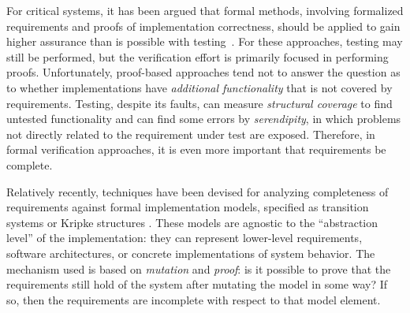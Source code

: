 

For critical systems, it has been argued that formal methods, involving formalized requirements and proofs of implementation correctness, should be applied to gain higher assurance than is possible with testing~\cite{ModelCheckingTakesOff,Miller,Rushby}.  For these approaches, testing may still be performed, but the verification effort is primarily focused in performing proofs.  Unfortunately, proof-based approaches tend not to answer the question as to whether implementations have {\em additional functionality} that is not covered by requirements.  Testing, despite its faults, can measure {\em structural coverage} to find untested functionality and can find some errors by {\em serendipity}, in which problems not directly related to the requirement under test are exposed.  Therefore, in formal verification approaches, it is even more important that requirements be complete.

Relatively recently, techniques have been devised for analyzing completeness of requirements against formal implementation models, specified as transition systems or Kripke structures \cite{chockler2001practical,das2005formal, claessen2007coverage, grosse2007estimating}.  These models are agnostic to the ``abstraction level'' of the implementation: they can represent lower-level requirements, software architectures, or concrete implementations of system behavior.  The mechanism used is based on {\em mutation} and {\em proof}: is it possible to prove that the requirements still hold of the system after mutating the model in some way?  If so, then the requirements are incomplete with respect to that model element.

